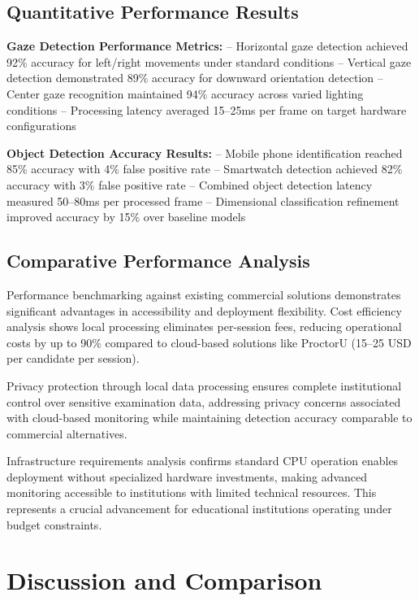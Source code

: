 \documentclass[conference]{IEEEtran}
\begin{document}
\subsection{Quantitative Performance Results}

\textbf{Gaze Detection Performance Metrics:}
-- Horizontal gaze detection achieved 92\% accuracy for left/right movements under 
standard conditions
-- Vertical gaze detection demonstrated 89\% accuracy for downward orientation 
detection
-- Center gaze recognition maintained 94\% accuracy across varied lighting 
conditions
-- Processing latency averaged 15--25ms per frame on target hardware 
configurations

\textbf{Object Detection Accuracy Results:}
-- Mobile phone identification reached 85\% accuracy with 4\% false positive rate
-- Smartwatch detection achieved 82\% accuracy with 3\% false positive rate
-- Combined object detection latency measured 50--80ms per processed frame
-- Dimensional classification refinement improved accuracy by 15\% over baseline 
models

\subsection{Comparative Performance Analysis}

Performance benchmarking against existing commercial solutions demonstrates significant 
advantages in accessibility and deployment flexibility\cite{proctoru}\cite{proctorio}\cite{respondus}. 
Cost efficiency analysis shows local processing eliminates per-session fees, reducing 
operational costs by up to 90\% compared to cloud-based solutions like ProctorU 
(15--25 USD per candidate per session).

Privacy protection through local data processing ensures complete institutional control 
over sensitive examination data, addressing privacy concerns associated with cloud-based 
monitoring while maintaining detection accuracy comparable to commercial alternatives.

Infrastructure requirements analysis confirms standard CPU operation enables deployment 
without specialized hardware investments, making advanced monitoring accessible to institutions 
with limited technical resources. This represents a crucial advancement for educational 
institutions operating under budget constraints\cite{pyqt5}.

\section{Discussion and Comparison}
\end{document}
